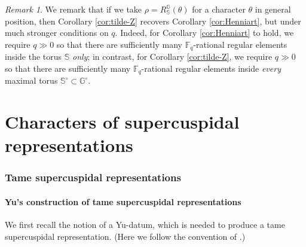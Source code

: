 \documentclass{amsart}
\newcommand{\FF}{\mathbb{F}}
\newcommand{\bbS}{\mathbb{S}}
\newcommand{\bbG}{\mathbb{G}}
\theoremstyle{plain}
\theoremstyle{definition}
\theoremstyle{remark}
\newtheorem{remark}[thm]{Remark}
\theoremstyle{theorem}
\begin{document}
\begin{remark}
    We remark that if we take $\rho = R_{\bbS}^\bbG(\theta)$ for a character $\theta$ in general position, then Corollary \ref{cor:tilde-Z} recovers Corollary \ref{cor:Henniart}, but under much stronger conditions on $q$. Indeed, for Corollary \ref{cor:Henniart} to hold, we require $q\gg0$ so that there are sufficiently many $\FF_q$-rational regular elements inside the torus $\bbS$ \textit{only}; in contrast, for Corollary \ref{cor:tilde-Z}, we require $q \gg0$ so that there are sufficiently many $\FF_q$-rational regular elements inside \textit{every} maximal torus $\bbS^\circ \subset \bbG^\circ$.
\end{remark}



\newpage



\part{Characters of supercuspidal representations}\label{part:formula}

\section{Tame supercuspidal representations}\label{sec:tamesc}

\subsection{Yu's construction of tame supercuspidal representations}\label{subsec:tamesc}

We first recall the notion of a Yu-datum, which is needed to produce a tame supercuspidal representation.
(Here we follow the convention of \cite[Section 3.1]{HM08}.)
\end{document}
